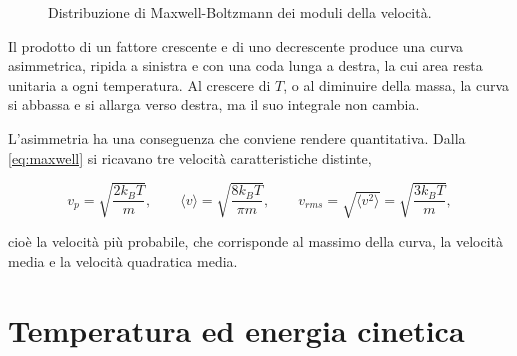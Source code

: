 \begin{figure}[htbp]
    \centering
    \caption{Distribuzione di Maxwell-Boltzmann dei moduli della velocità.}
    \label{fig:maxwell}
\end{figure}

Il prodotto di un fattore crescente e di uno decrescente produce una curva asimmetrica, ripida a sinistra e con una coda lunga a destra, la cui area resta unitaria a ogni temperatura.
Al crescere di $T$, o al diminuire della massa, la curva si abbassa e si allarga verso destra, ma il suo integrale non cambia.

L'asimmetria ha una conseguenza che conviene rendere quantitativa.
Dalla \eqref{eq:maxwell} si ricavano tre velocità caratteristiche distinte,

\begin{equation}
    v_p = \sqrt{\frac{2k_BT}{m}},
    \qquad
    \langle v\rangle = \sqrt{\frac{8k_BT}{\pi m}},
    \qquad
    v_{rms} = \sqrt{\langle v^2\rangle} = \sqrt{\frac{3k_BT}{m}},
    \label{eq:velocitacaratteristiche}
\end{equation}

cioè la velocità più probabile, che corrisponde al massimo della curva, la velocità media e la velocità quadratica media.

\section{Temperatura ed energia cinetica}

